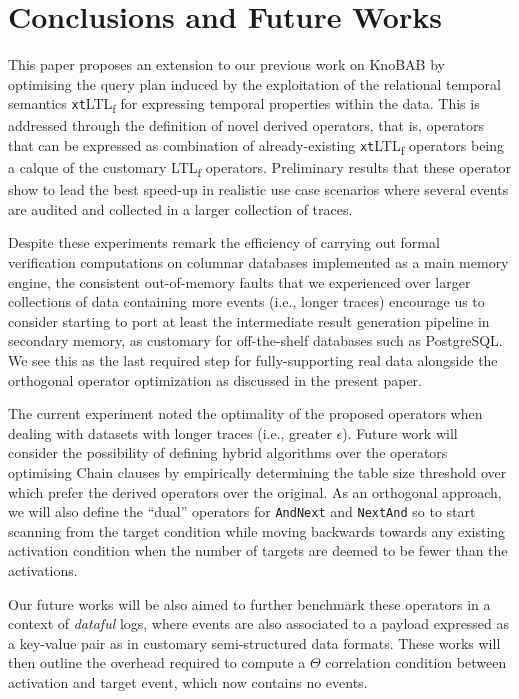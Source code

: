 \documentclass[sigconf]{acmart}
\begin{document}

\section{Conclusions and Future Works}
This paper proposes an extension to our previous work on KnoBAB by optimising the query plan induced by the exploitation of the relational temporal semantics \texttt{xt}LTL\textsubscript{f} for expressing temporal properties within the data. This is addressed through the definition of novel derived operators, that is, operators that can be expressed as combination of already-existing \texttt{xt}LTL\textsubscript{f} operators being a calque of the customary LTL\textsubscript{f} operators. Preliminary results that these operator show to lead the best speed-up in realistic use case scenarios where several events are audited and collected in a larger collection of traces.

Despite these experiments remark the efficiency of carrying out formal verification computations on columnar databases implemented as a main memory engine, the consistent out-of-memory faults that we experienced over larger collections of data containing more events (i.e., longer traces) encourage us to consider starting to port at least the intermediate result generation pipeline in secondary memory, as customary for off-the-shelf databases such as PostgreSQL. We see this as the last required step for fully-supporting real data alongside the orthogonal operator optimization as discussed in the present paper. 

The current experiment noted the optimality of the proposed operators when dealing with datasets with longer traces (i.e., greater $\epsilon$). Future work will consider the possibility of defining hybrid algorithms \cite{4567924} over the operators optimising Chain clauses  by empirically determining the table size threshold over which prefer the derived operators over the original. As an orthogonal approach, we will also define the ``dual'' operators for \texttt{AndNext} and \texttt{NextAnd} so to start scanning from the target condition while moving backwards towards any existing activation condition when the number of targets are deemed to be fewer than the activations. 

Our future works will be also aimed to further benchmark these operators in a context of \textit{dataful} logs, where events are also associated to a payload expressed as a key-value pair as in customary semi-structured data formats. These works will then outline the overhead required to compute a $\Theta$ correlation condition between activation and target event, which now contains no events. 
\end{document}
